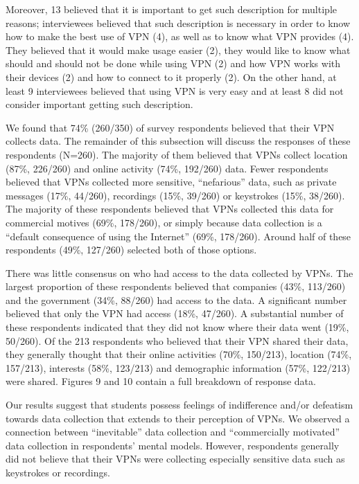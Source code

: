 Moreover, 13 believed that it is important to get such description for multiple reasons; interviewees believed that such description is necessary in order to know how to make the best use of VPN (4), as well as to know what VPN provides (4). They believed that it would make usage easier (2), they would like to know what should and should not be done while using VPN (2) and how VPN works with their devices (2) and how to connect to it properly (2). On the other hand, at least 9 interviewees believed that using VPN is very easy and at least 8 did not consider important getting such description. 

We found that 74\% (260/350) of survey respondents believed that their VPN collects data. The remainder of this subsection will discuss the responses of these respondents (N=260). The majority of them believed that VPNs collect location (87\%, 226/260) and online activity (74\%, 192/260) data. Fewer respondents believed that VPNs collected more sensitive, “nefarious” data, such as private messages (17\%, 44/260), recordings (15\%, 39/260) or keystrokes (15\%, 38/260). The majority of these respondents believed that VPNs collected this data for commercial motives (69\%, 178/260), or simply because data collection is a “default consequence of using the Internet” (69\%, 178/260). Around half of these respondents (49\%, 127/260) selected both of those options.

There was little consensus on who had access to the data collected by VPNs. The largest proportion of these respondents believed that companies (43\%, 113/260) and the government (34\%, 88/260) had access to the data. A significant number believed that only the VPN had access (18\%, 47/260). A substantial number of these respondents indicated that they did not know where their data went (19\%, 50/260). Of the 213 respondents who believed that their VPN shared their data, they generally thought that their online activities (70\%, 150/213), location (74\%, 157/213), interests (58\%, 123/213) and demographic information (57\%, 122/213) were shared. Figures 9 and 10 contain a full breakdown of response data.

Our results suggest that students possess feelings of indifference and/or defeatism towards data collection that extends to their perception of VPNs. We observed a connection between “inevitable” data collection and “commercially motivated” data collection in respondents’ mental models. However, respondents generally did not believe that their VPNs were collecting especially sensitive data such as keystrokes or recordings.



